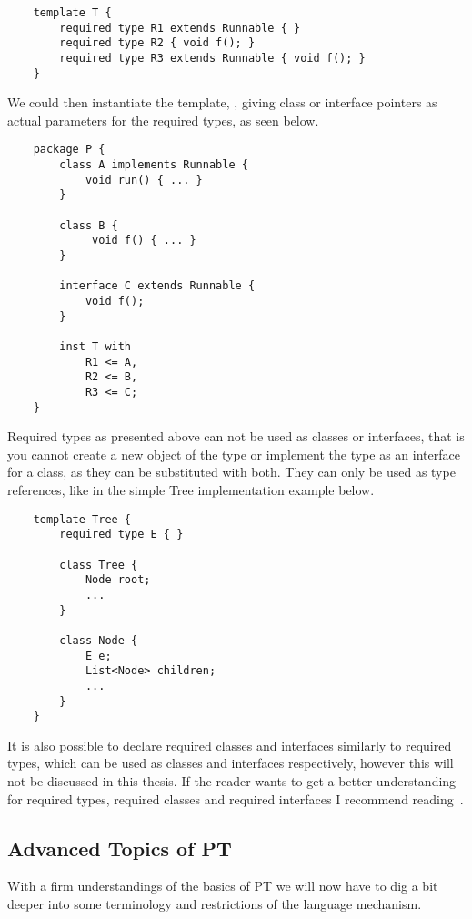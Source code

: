 \begin{verbatim}
    template T {
        required type R1 extends Runnable { }
        required type R2 { void f(); }
        required type R3 extends Runnable { void f(); }
    }
\end{verbatim}

We could then instantiate the template, , giving class or interface pointers as actual parameters for the required types, as seen below.

\begin{verbatim}
    package P {
        class A implements Runnable {
            void run() { ... }
        }

        class B {
             void f() { ... }
        }

        interface C extends Runnable {
            void f();
        }

        inst T with
            R1 <= A,
            R2 <= B,
            R3 <= C;
    }
\end{verbatim}

Required types as presented above can not be used as classes or interfaces, that is you cannot create a new object of the type or implement the type as an interface for a class, as they can be substituted with both.
They can only be used as type references, like in the simple Tree implementation example below.

\begin{verbatim}
    template Tree {
        required type E { }

        class Tree {
            Node root;
            ...
        }

        class Node {
            E e;
            List<Node> children;
            ...
        }
    }
\end{verbatim}

It is also possible to declare required classes and interfaces similarly to required types, which can be used as classes and interfaces respectively, however this will not be discussed in this thesis.
If the reader wants to get a better understanding for required types, required classes and required interfaces I recommend reading~\cite{requiredtypes}.

\subsection{Advanced Topics of PT}\label{subsec:advanced-topics-of-pt}

With a firm understandings of the basics of PT we will now have to dig a bit deeper into some terminology and restrictions of the language mechanism.

